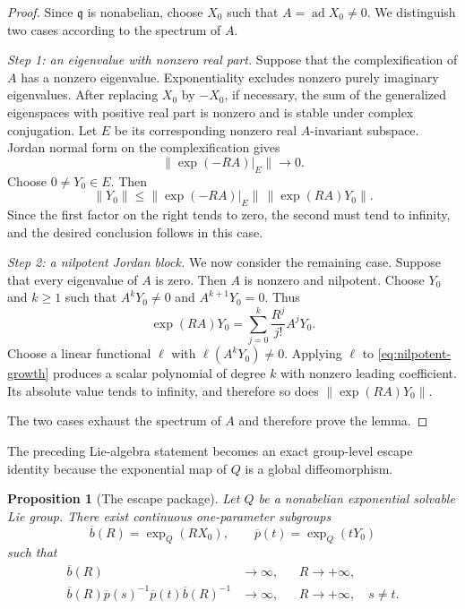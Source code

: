 \documentclass[reqno]{amsart}
\numberwithin{equation}{section}
\newtheorem{proposition}[theorem]{Proposition}
\theoremstyle{definition}
\theoremstyle{remark}
\newcommand{\ad}{\operatorname{ad}}
\newcommand{\Step}[1]{\par\medskip\noindent\textit{#1.}\quad}
\begin{document}
\begin{proof}
Since $\mathfrak q$ is nonabelian, choose $X_0$ such that
$A=\ad X_0\neq0$.  We distinguish two cases according to the spectrum of
$A$.

\Step{Step 1: an eigenvalue with nonzero real part}
Suppose that the complexification of $A$ has a nonzero eigenvalue.
Exponentiality excludes nonzero purely imaginary eigenvalues.  After
replacing $X_0$ by $-X_0$, if necessary, the sum of the generalized
eigenspaces with positive real part is nonzero and is stable under complex
conjugation.  Let $E$ be its corresponding nonzero real $A$-invariant
subspace.  Jordan normal form on the complexification gives
\begin{equation}\label{eq:contracting-inverse}
 \|\exp(-RA)|_E\|\longrightarrow0.
\end{equation}
Choose $0\neq Y_0\in E$.  Then
\[
 \|Y_0\|
 \leq \|\exp(-RA)|_E\|\,\|\exp(RA)Y_0\|.
\]
Since the first factor on the right tends to zero, the second must tend to
infinity, and the desired conclusion follows in this case.

\Step{Step 2: a nilpotent Jordan block}
We now consider the remaining case.  Suppose that every eigenvalue of $A$ is
zero.  Then $A$ is nonzero and
nilpotent.  Choose $Y_0$ and $k\geq1$ such that
$A^kY_0\neq0$ and $A^{k+1}Y_0=0$.  Thus
\begin{equation}\label{eq:nilpotent-growth}
 \exp(RA)Y_0=\sum_{j=0}^{k}\frac{R^j}{j!}A^jY_0.
\end{equation}
Choose a linear functional $\ell$ with $\ell(A^kY_0)\neq0$.  Applying
$\ell$ to \eqref{eq:nilpotent-growth} produces a scalar polynomial of degree
$k$ with nonzero leading coefficient.  Its absolute value tends to infinity,
and therefore so does $\|\exp(RA)Y_0\|$.

The two cases exhaust the spectrum of $A$ and therefore prove the lemma.
\end{proof}

The preceding Lie-algebra statement becomes an exact group-level escape
identity because the exponential map of $Q$ is a global diffeomorphism.

\begin{proposition}[The escape package]
\label{prop:geometric-escape}
Let $Q$ be a nonabelian exponential solvable Lie group.  There exist continuous
one-parameter subgroups
\[
 \overline b(R)=\exp_Q(RX_0),
 \qquad
 \overline p(t)=\exp_Q(tY_0)
\]
such that
\begin{align}
 \overline b(R)&\longrightarrow\infty,
 &&R\to+\infty,                                  \label{eq:b-escape-Q}\\
 \overline b(R)\overline p(s)^{-1}\overline p(t)
 \overline b(R)^{-1}&\longrightarrow\infty,
 &&R\to+\infty,\quad s\neq t.                  \label{eq:conj-escape-Q}
\end{align}
\end{proposition}
\end{document}
